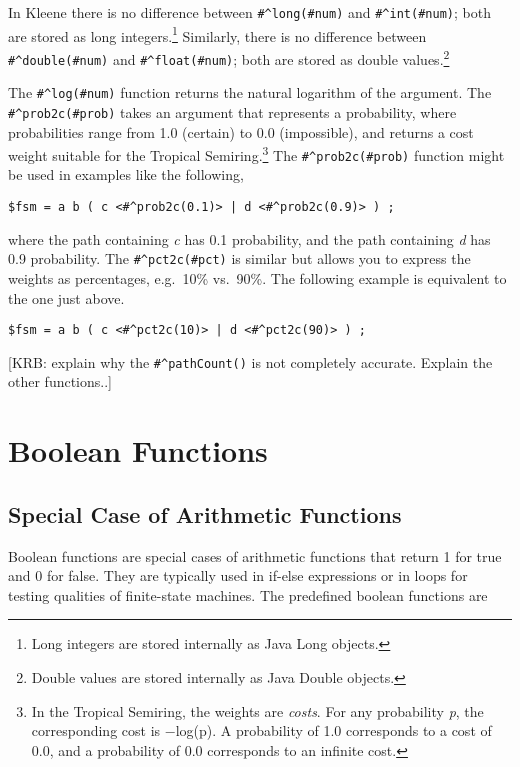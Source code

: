 \vspace{0.5cm}

In Kleene there is no difference between \verb!#^long(#num)! and
\verb!#^int(#num)!; both are stored as long integers.\footnote{Long
integers are stored internally as Java Long objects.}  Similarly, there
is no difference between \verb!#^double(#num)! and \verb!#^float(#num)!;
both are stored as double values.\footnote{Double values are stored
internally as Java Double objects.}  

The \verb!#^log(#num)! function returns the natural logarithm of the
argument.
The \verb!#^prob2c(#prob)! takes an argument that represents a probability,
where probabilities range from 1.0 (certain) to 0.0 (impossible), and
returns a cost weight suitable for the Tropical Semiring.\footnote{In
	the Tropical Semiring, the weights are \emph{costs}.  For any
probability \emph{p}, the corresponding cost is $-$log(p).  A probability
of 1.0 corresponds to a cost of 0.0, and a probability of 0.0
corresponds to an infinite cost.}  The \verb!#^prob2c(#prob)! function might
be used in examples like the following,

\begin{Verbatim}[fontsize=\small]
$fsm = a b ( c <#^prob2c(0.1)> | d <#^prob2c(0.9)> ) ;
\end{Verbatim}

\noindent
where the path containing \emph{c} has 0.1 probability, and the path containing
\emph{d} has 0.9 probability.  The \verb!#^pct2c(#pct)! is similar but allows you
to express the weights as percentages, e.g.\ 10\% vs.\ 90\%.  The following example is equivalent to the
one just above.

\begin{Verbatim}[fontsize=\small]
$fsm = a b ( c <#^pct2c(10)> | d <#^pct2c(90)> ) ;
\end{Verbatim}


[KRB:  explain why the \verb!#^pathCount()! is not completely accurate.
Explain the other functions..]  

\section{Boolean Functions}

\subsection{Special Case of Arithmetic Functions}

Boolean functions are special cases of arithmetic functions that return 1 for true and 0 for false.  They
are typically used in if-else expressions or in loops for testing qualities of finite-state machines.
The predefined boolean functions are 

